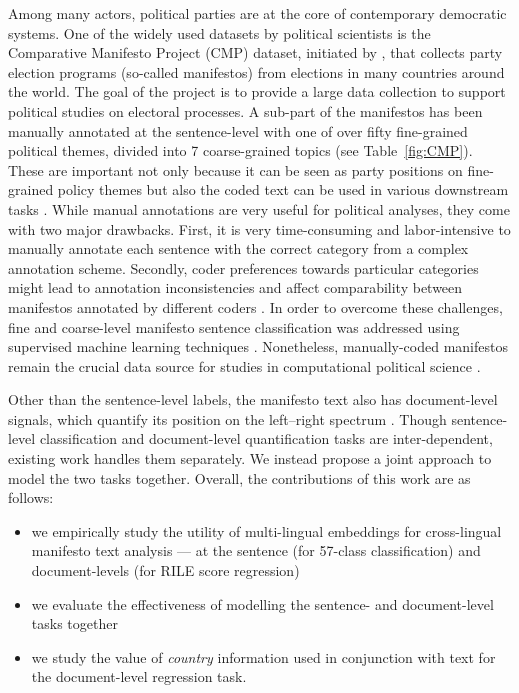 \documentclass[11pt,a4paper]{article}
\newcommand{\tabref}[2][]{Table#1~\ref{#2}\xspace}
\begin{document}
Among many actors, political parties are at the core of contemporary democratic systems. One of the widely used datasets by political scientists is the Comparative
Manifesto Project (CMP) dataset, initiated by , that collects party election programs (so-called manifestos) from elections in many countries around the world. The goal of the project is to provide a large data collection to support political studies on electoral processes. A sub-part of the manifestos has been manually annotated at the sentence-level with one of over fifty fine-grained political themes, divided into 7 coarse-grained topics (see \tabref{fig:CMP}). These are important not only because it can be seen as party positions on fine-grained policy themes but also the coded text can be used in various downstream tasks \cite{lowe2011scaling}. While manual annotations are very useful for political analyses, they come with two major drawbacks. First, it is very time-consuming and labor-intensive to manually annotate each sentence with the correct category from a complex annotation scheme. Secondly, coder preferences towards particular categories might lead to annotation inconsistencies and affect comparability between manifestos annotated by different coders \cite{coder}. In order to overcome these challenges, fine and coarse-level manifesto sentence classification was addressed using supervised machine learning techniques \cite{verberne2014automatic, zirn2016classifying}. Nonetheless, manually-coded manifestos remain the crucial data source for studies in computational political science \cite{lowe2011scaling, nanni}. 


Other than the sentence-level labels, the manifesto text also has document-level signals,
which quantify its position on the left--right spectrum \cite{slapin2008scaling}. Though sentence-level classification and document-level quantification tasks are inter-dependent, existing work handles them separately.  We instead propose a joint approach to model the two tasks together. Overall, the contributions of this work are as follows:
\begin{itemize}
\item we empirically study the utility of multi-lingual embeddings for cross-lingual manifesto text analysis --- at the sentence (for 57-class classification) and document-levels (for RILE score regression)

\item we evaluate the effectiveness of modelling the sentence- and document-level tasks together

\item we study the value of \textit{country} information used in conjunction with text for the document-level regression task.
\end{itemize}
\end{document}
